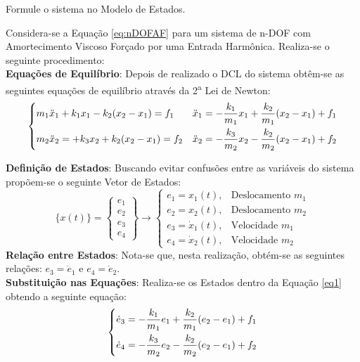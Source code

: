 \documentclass{article}
\begin{document}
\newpage\begin{exercise}\label{ex9}
    Formule o sistema no Modelo de Estados.
\end{exercise}
\begin{resolution}
    Considera-se a Equação \ref{eq:nDOFAF} para um sistema de n-DOF com Amortecimento Viscoso Forçado por uma Entrada Harmônica. Realiza-se o seguinte procedimento:\\

    \textbf{Equações de Equilíbrio}: Depois de realizado o DCL do sistema obtêm-se as seguintes equações de equilíbrio através da 2\textsuperscript{a} Lei de Newton:
    \begin{equation}\label{eq1}
        \begin{dcases}
            m_1 \ddot{x}_1 +k_1 x_1 - k_2 (x_2 - x_1) = f_1 & 
            \ddot{x}_1 = -\frac{k_1}{m_1} x_1 +\frac{k_2}{m_1} (x_2 - x_1) + f_1\\
            m_2 \ddot{x}_2 = +k_3 x_2 + k_2 (x_2 - x_1) = f_2 &
            \ddot{x}_2 = -\frac{k_3}{m_2} x_2 -\frac{k_2}{m_2} (x_2 - x_1) + f_2\\
        \end{dcases}
    \end{equation}

    \textbf{Definição de Estados}: Buscando evitar confusões entre as variáveis do sistema propõem-se o seguinte Vetor de Estados:
    \begin{equation*}
        \lbrace x(t) \rbrace = \begin{Bmatrix} e_1\\ e_2\\ e_3\\ e_4 \end{Bmatrix} 
        \to
        \begin{cases}
            e_1 = x_1(t), &\text{Deslocamento } m_1\\
            e_2 = x_2(t), &\text{Deslocamento } m_2\\
            e_3 = \dot{x}_1(t),&\text{Velocidade } m_1\\
            e_4 = \dot{x}_2(t),&\text{Velocidade } m_2
        \end{cases}
    \end{equation*}
    \textbf{Relação entre Estados}: Nota-se que, nesta realização, obtém-se as seguintes relações: $e_3 = \dot{e}_1$ e $e_4 = \dot{e}_2$.\\

    \textbf{Substituição nas Equações}: Realiza-se os Estados dentro da Equação \ref{eq1} obtendo a seguinte equação:
    \begin{equation*}
        \begin{dcases}
            \dot{e}_3 = -\frac{k_1}{m_1} e_1 +\frac{k_2}{m_1} (e_2 - e_1) + f_1\\
            \dot{e}_4 = -\frac{k_3}{m_2} e_2 -\frac{k_2}{m_2} (e_2 - e_1) + f_2\\
        \end{dcases}
    \end{equation*}


\end{resolution}
\end{document}

